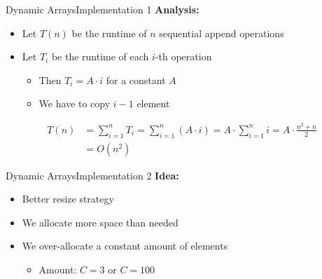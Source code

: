 
\begin{frame}{Dynamic Arrays}{Implementation 1}
  \textbf{Analysis:}
  \begin{itemize}
    \item
      Let $T(n)$ be the runtime of $n$ sequential append operations
    \item
      Let $T_i$ be the runtime of each $i$-th operation
      \begin{itemize}
        \item
          Then $T_i = A \cdot i $ for a constant $A$
        \item
           We have to copy $i-1$ element    
      \end{itemize}
  \end{itemize}
  \begin{align*}
    T(n) &= \sum_{i=1}^n T_i
      = \sum_{i=1}^n \left(A \cdot i \right)
      = A \cdot \sum_{i=1}^n i = A \cdot \frac{n^2 + n}{2}\\
      &= O(n^2)
  \end{align*}
\end{frame}


\begin{frame}{Dynamic Arrays}{Implementation 2}
  \textbf{Idea:}
  \begin{itemize}
    \item
      Better resize strategy
    \item
      We allocate more space than needed
    \item
      We over-allocate a constant amount of elements
      \begin{itemize}
        \item
          Amount: $C = 3$ or $C = 100$
      \end{itemize}
  \end{itemize}
\end{frame}




